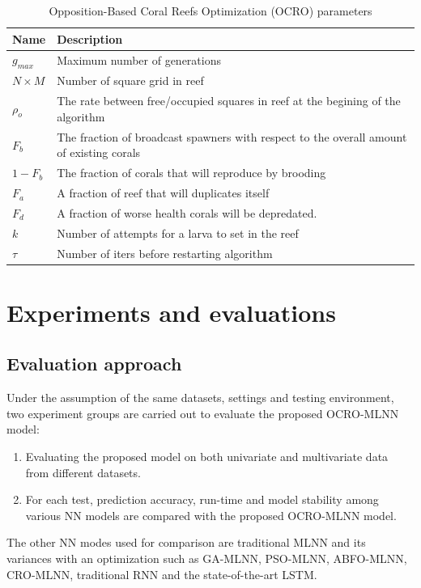 \documentclass[review,3p,authoryear]{elsarticle}
\begin{document}
\begin{table}[!h]
\begin{center}
\begin{tabular}{ C{1.5cm}| L{14cm}  } 
\textbf{Name} & \textbf{Description} \\ 		\hline
$g_{max}$ & Maximum number of generations \\ 	%
$N \times M$ & Number of square grid in reef \\ 		%
$\rho_{o}$ & The rate between free/occupied squares in reef at the begining of the algorithm \\ 		%
$F_{b}$ & The fraction of broadcast spawners with respect to the overall amount of existing corals \\ 	%
$1 - F_{b}$ & The fraction of corals that will reproduce by brooding \\ 	%
$F_{a}$ & A fraction of reef that will duplicates itself \\ 				%
$F_{d}$ & A fraction of worse health corals will be depredated.  \\ 		%
$k$ & Number of attempts for a larva to set in the reef \\ 				%
$\tau$ & Number of iters before restarting algorithm \\ 					%
\end{tabular}
\end{center}
\caption{Opposition-Based Coral Reefs Optimization (OCRO) parameters}
\label{table:ocro_paras}
\end{table}




\section{Experiments and evaluations}
\label{experiments}

\subsection{Evaluation approach}

Under the assumption of the same datasets, settings and testing environment, two experiment groups are carried out to evaluate the proposed OCRO-MLNN model:

\begin{enumerate}
	\item Evaluating the proposed model on both univariate and multivariate data from different datasets.
	\item For each test, prediction accuracy, run-time and model stability among various NN models are compared with the proposed OCRO-MLNN model. 
\end{enumerate}
The other NN modes used for comparison are traditional MLNN and its variances with an optimization such as GA-MLNN, PSO-MLNN, ABFO-MLNN, CRO-MLNN, traditional RNN and the state-of-the-art LSTM.
\end{document}
